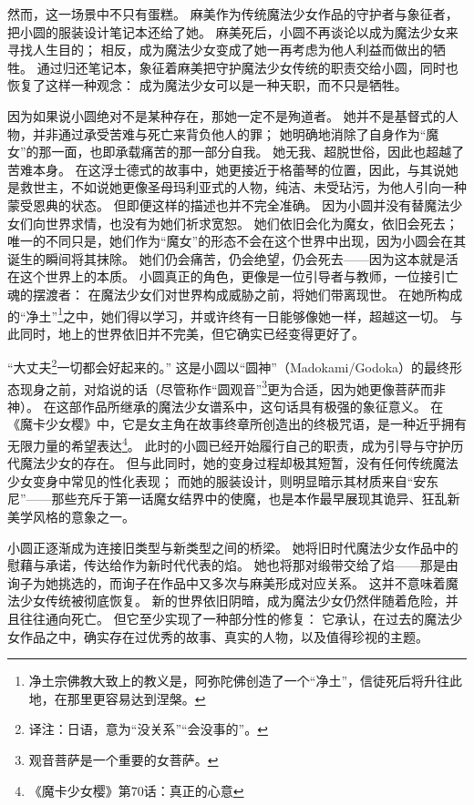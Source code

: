 然而，这一场景中不只有蛋糕。
麻美作为传统魔法少女作品的守护者与象征者，把小圆的服装设计笔记本还给了她。
麻美死后，小圆不再谈论以成为魔法少女来寻找人生目的；
相反，成为魔法少女变成了她一再考虑为他人利益而做出的牺牲。
通过归还笔记本，象征着麻美把守护魔法少女传统的职责交给小圆，同时也恢复了这样一种观念：
成为魔法少女可以是一种天职，而不只是牺牲。

因为如果说小圆绝对不是某种存在，那她一定不是殉道者。
她并不是基督式的人物，并非通过承受苦难与死亡来背负他人的罪；
她明确地消除了自身作为“魔女”的那一面，也即承载痛苦的那一部分自我。
她无我、超脱世俗，因此也超越了苦难本身。
在这浮士德式的故事中，她更接近于格蕾琴\cite{ref72}的位置，因此，与其说她是救世主，不如说她更像圣母玛利亚式的人物，纯洁、未受玷污，为他人引向一种蒙受恩典的状态。
但即便这样的描述也并不完全准确。
因为小圆并没有替魔法少女们向世界求情，也没有为她们祈求宽恕。
她们依旧会化为魔女，依旧会死去；
唯一的不同只是，她们作为“魔女”的形态不会在这个世界中出现，因为小圆会在其诞生的瞬间将其抹除。
她们仍会痛苦，仍会绝望，仍会死去——因为这本就是活在这个世界上的本质。
小圆真正的角色，更像是一位引导者与教师，一位接引亡魂的摆渡者：
在魔法少女们对世界构成威胁之前，将她们带离现世。
在她所构成的“净土”\footnote{%
    净土宗佛教大致上的教义是，阿弥陀佛创造了一个“净土”，信徒死后将升往此地，在那里更容易达到涅槃。
}\cite{ref73}之中，她们得以学习，并或许终有一日能够像她一样，超越这一切。
与此同时，地上的世界依旧并不完美，但它确实已经变得更好了。

“大丈夫\footnote{%
    译注：日语，意为“没关系”“会没事的”。
}一切都会好起来的。”
这是小圆以“圆神”（Madokami/Godoka）的最终形态现身之前，对焰说的话（尽管称作“圆观音”\footnote{%
    观音菩萨是一个重要的女菩萨。
}\cite{ref73}更为合适，因为她更像菩萨而非神）。
在这部作品所继承的魔法少女谱系中，这句话具有极强的象征意义。
在《魔卡少女樱》中，它是女主角在故事终章所创造出的终极咒语，是一种近乎拥有无限力量的希望表达\footnote{%
    《魔卡少女樱》第70话：真正的心意
}。
此时的小圆已经开始履行自己的职责，成为引导与守护历代魔法少女的存在。
但与此同时，她的变身过程却极其短暂，没有任何传统魔法少女变身中常见的性化表现；
而她的服装设计，则明显暗示其材质来自“安东尼”——那些充斥于第一话魔女结界中的使魔，也是本作最早展现其诡异、狂乱新美学风格的意象之一。

小圆正逐渐成为连接旧类型与新类型之间的桥梁。
她将旧时代魔法少女作品中的慰藉与承诺，传达给作为新时代代表的焰。
她也将那对缎带交给了焰——那是由询子为她挑选的，而询子在作品中又多次与麻美形成对应关系。
这并不意味着魔法少女传统被彻底恢复。
新的世界依旧阴暗，成为魔法少女仍然伴随着危险，并且往往通向死亡。
但它至少实现了一种部分性的修复：
它承认，在过去的魔法少女作品之中，确实存在过优秀的故事、真实的人物，以及值得珍视的主题。

